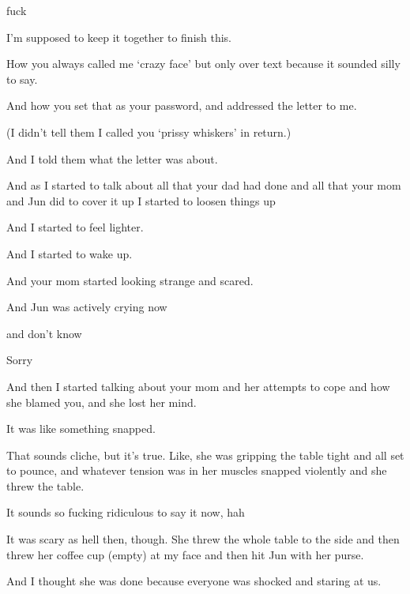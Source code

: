 { fuck

 I'm supposed to keep it together to finish this.

 How you always called me `crazy face' but only over text because it sounded silly to say.

 And how you set that as your password, and addressed the letter to me.

(I didn't tell them I called you
`prissy whiskers' in return.)

 And I told them what the letter was about.

 And as I started to talk about all that your dad had done and all that your mom and Jun did to cover it up I started to loosen things up

 And I started to feel lighter.

 And I started to wake up.

 And your mom started looking strange and scared.

 And Jun was actively crying now

 and don't know

\nopagebreak

 Sorry

 And then I started talking about your mom and her attempts to cope and how she blamed you, and she lost her mind.

 It was like something snapped.

 That sounds cliche, but it's true. Like, she was gripping the table tight and all set to pounce, and whatever tension was in her muscles snapped violently and she threw the table.

 It sounds so fucking ridiculous to say it now, hah

 It was scary as hell then, though. She threw the whole table to the side and then threw her coffee cup
(empty) at my face and then hit Jun with her purse.

 And I thought she was done because everyone was shocked and staring at us.

}
